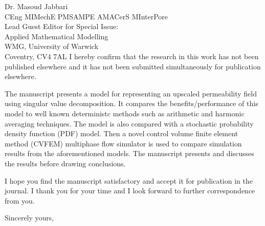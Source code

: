 \documentclass[11pt]{letter} %
\begin{document}
\begin{letter}{Dr. Masoud Jabbari \\
CEng MIMechE PMSAMPE AMACerS MInterPore \\
Lead Guest Editor for Special Issue: \\
Applied Mathematical Modelling \\
WMG, University of Warwick \\
Coventry, CV4 7AL}
I hereby confirm that the research in this work has not been published elsewhere and it has not been submitted simultaneously for publication elsewhere.
 
The manuscript presents a model for representing an upscaled permeability field using singular value decomposition. It compares the benefits/performance of this model to well known deterministc methods such as arithmetic and harmonic averaging techniques. The model is also compared with a stochastic probability density function (PDF) model. Then a novel control volume finite element method (CVFEM) multiphase flow simulator is used to compare simulation results from the aforementioned models. The manuscript presents and discusses the results before drawing conclusions.

I hope you find the manuscript satisfactory and accept it for publication in the journal. I thank you for your time and I look forward to further correspondence from you.

\closing{Sincerely yours,}




\end{letter}
\end{document}
